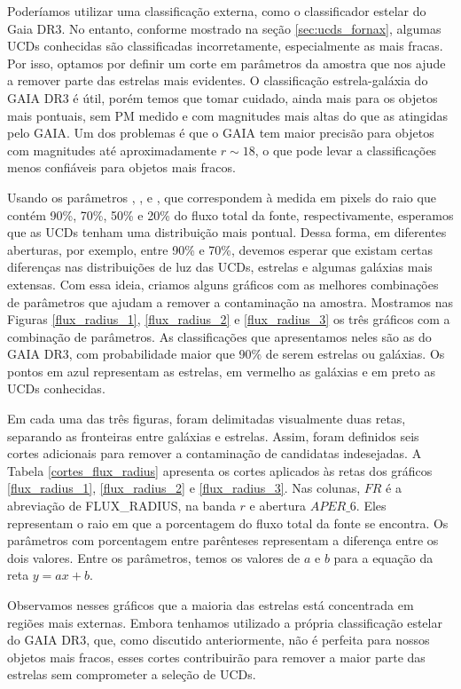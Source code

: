 Poderíamos utilizar uma classificação externa, como o classificador estelar do Gaia DR3. No entanto, conforme mostrado na seção \ref{sec:ucds_fornax}, algumas UCDs conhecidas são classificadas incorretamente, especialmente as mais fracas. Por isso, optamos por definir um corte em parâmetros da amostra que nos ajude a remover parte das estrelas mais evidentes. O classificação estrela-galáxia do GAIA DR3 é útil, porém temos que tomar cuidado, ainda mais para os objetos mais pontuais, sem \ac{PM} medido e com magnitudes mais altas do que as atingidas pelo GAIA. Um dos problemas é que o GAIA tem maior precisão para objetos com magnitudes até aproximadamente $r \sim 18$, o que pode levar a classificações menos confiáveis para objetos mais fracos.

{\sloppy
Usando os parâmetros , ,  e , que correspondem à medida em pixels do raio que contém 90\%, 70\%, 50\% e 20\% do fluxo total da fonte, respectivamente, esperamos que as UCDs tenham uma distribuição mais pontual. Dessa forma, em diferentes aberturas, por exemplo, entre 90\% e 70\%, devemos esperar que existam certas diferenças nas distribuições de luz das UCDs, estrelas e algumas galáxias mais extensas. Com essa ideia, criamos alguns gráficos com as melhores combinações de parâmetros que ajudam a remover a contaminação na amostra. Mostramos nas Figuras \ref{flux_radius_1}, \ref{flux_radius_2} e \ref{flux_radius_3} os três gráficos com a combinação de parâmetros. As classificações que apresentamos neles são as do GAIA DR3, com probabilidade maior que 90\% de serem estrelas ou galáxias. Os pontos em azul representam as estrelas, em vermelho as galáxias e em preto as UCDs conhecidas.}

Em cada uma das três figuras, foram delimitadas visualmente duas retas, separando as fronteiras entre galáxias e estrelas. Assim, foram definidos seis cortes adicionais para remover a contaminação de candidatas indesejadas. A Tabela \ref{cortes_flux_radius} apresenta os cortes aplicados às retas dos gráficos \ref{flux_radius_1}, \ref{flux_radius_2} e \ref{flux_radius_3}. Nas colunas, $FR$ é a abreviação de FLUX\_RADIUS, na banda $r$ e abertura $APER\_6$. Eles representam o raio em que a porcentagem do fluxo total da fonte se encontra. Os parâmetros com porcentagem entre parênteses representam a diferença entre os dois valores. Entre os parâmetros, temos os valores de $a$ e $b$ para a equação da reta $y = ax + b$. 

Observamos nesses gráficos que a maioria das estrelas está concentrada em regiões mais externas. Embora tenhamos utilizado a própria classificação estelar do GAIA DR3, que, como discutido anteriormente, não é perfeita para nossos objetos mais fracos, esses cortes contribuirão para remover a maior parte das estrelas sem comprometer a seleção de UCDs.

